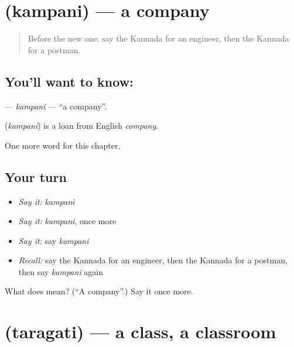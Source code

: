 \section[\texorpdfstring{\kn{ಕಂಪನಿ} (kampani)}{ಕಂಪನಿ (kampani)}]{ (kampani) — a company}

\label{lesson:KA-C268-kampani}



\begin{quote}
Before the new one: say the Kannada for an engineer, then the Kannada for a postman.
\end{quote}

\subsection*{You'll want to know: }
\textbf{} — \emph{kampani} — \textquotedblleft{}a company\textquotedblright{}.

\begin{cousinweb}
\textbf{} (\emph{kampani}) is a loan from English \emph{company}.
\end{cousinweb}

\begin{grammarlens}[title={What you've built}]
One more word for this chapter.
\end{grammarlens}

\subsection*{Your turn}
\begin{itemize}
\raggedright
  \item \emph{Say it:} \emph{kampani}
  \item \emph{Say it:} \emph{kampani}, once more
  \item \emph{Say it:} say \emph{kampani}
  \item \emph{Recall:} say the Kannada for an engineer, then the Kannada for a postman, then say \emph{kampani} again
\end{itemize}

\begin{tcolorbox}[breakable,colback=teal!4,colframe=teal!35!black,title={Before you move on}]
What does  mean? (\textquotedblleft{}A company\textquotedblright{}.) Say it once more.
\end{tcolorbox}
\section[\texorpdfstring{\kn{ತರಗತಿ} (taragati)}{ತರಗತಿ (taragati)}]{ (taragati) — a class, a classroom}

